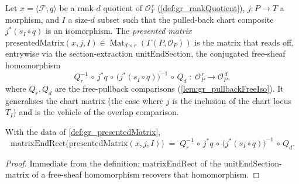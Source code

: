 \begin{definition}
  \label{def:gr_presentedMatrix}
  Let \(x = \langle\mathcal{F}, q\rangle\) be a rank-\(d\) quotient of \(\mathcal{O}_T^{\,r}\)
  (\cref{def:gr_rankQuotient}), \(j : P \to T\) a morphism, and \(I\) a size-\(d\) subset such
  that the pulled-back chart composite \(j^{*}(s_I \circ q)\) is an isomorphism. The
  \emph{presented matrix} \(\mathrm{presentedMatrix}(x, j, I) \in
  \operatorname{Mat}_{d\times r}(\Gamma(P, \mathcal{O}_P))\) is the matrix that reads off,
  entrywise via the section-extraction \(\mathrm{unitEndSection}\), the conjugated free-sheaf
  homomorphism
  \[
    Q_r^{-1} \,\circ\, j^{*}q \,\circ\, \bigl(j^{*}(s_I \circ q)\bigr)^{-1}
      \,\circ\, Q_d
      \;:\; \mathcal{O}_P^{\,r} \longrightarrow \mathcal{O}_P^{\,d},
  \]
  where \(Q_r, Q_d\) are the free-pullback comparisons (\cref{lem:gr_pullbackFreeIso}). It
  generalises the chart matrix (the case where \(j\) is the inclusion of the chart locus
  \(T_I\)) and is the vehicle of the overlap comparison.
\end{definition}

\begin{lemma}
  \label{lem:gr_matrixEndRect_presentedMatrix}
  With the data of \cref{def:gr_presentedMatrix},
  \[
    \mathrm{matrixEndRect}\bigl(\mathrm{presentedMatrix}(x, j, I)\bigr)
      \;=\; Q_r^{-1} \,\circ\, j^{*}q \,\circ\, \bigl(j^{*}(s_I \circ q)\bigr)^{-1}
      \,\circ\, Q_d.
  \]
\end{lemma}
\begin{proof}
  Immediate from the definition: \(\mathrm{matrixEndRect}\) of the
  \(\mathrm{unitEndSection}\)-matrix of a free-sheaf homomorphism recovers that homomorphism.
\end{proof}


